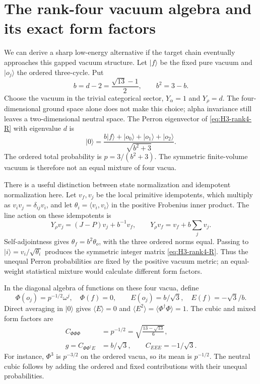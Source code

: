 \section{The rank-four vacuum algebra and its exact form factors}

We can derive a sharp low-energy alternative if the target chain
eventually approaches this gapped vacuum structure. Let $|f\rangle$
be the fixed pure vacuum and $|o_j\rangle$ the ordered three-cycle.
Put
\[
 b=d-2=\frac{\sqrt{13}-1}2,\qquad b^2=3-b.
\]
Choose the vacuum in the trivial categorical sector,
$Y_\alpha=1$ and $Y_\rho=d$. The four-dimensional ground space
alone does not make this choice; alpha invariance still leaves a
two-dimensional neutral space. The Perron eigenvector of
\eqref{eq:H3-rank4-R} with eigenvalue
$d$ is
\[
 |0\rangle=\frac{b|f\rangle+|o_0\rangle+|o_1\rangle+|o_2\rangle}
                  {\sqrt{b^2+3}}.
\]
The ordered total probability is $p=3/(b^2+3)$. The symmetric
finite-volume vacuum is therefore not an equal mixture of four
vacua.

There is a useful distinction between state normalization and
idempotent normalization here. Let $v_f,v_j$ be the local primitive
idempotents, which multiply as $v_i v_j=\delta_{ij}v_i$, and let
$\theta_i=\langle v_i,v_i\rangle$ in the positive Frobenius
inner product. The line action on these idempotents is
\[
 Y_\rho v_j=(J-P)v_j+b^{-1}v_f,
 \qquad Y_\rho v_f=v_f+b\sum_jv_j.
\]
Self-adjointness gives $\theta_f=b^2\theta_o$, with the three
ordered norms equal. Passing to $|i\rangle=v_i/\sqrt{\theta_i}$
produces the symmetric integer matrix
\eqref{eq:H3-rank4-R}. Thus the unequal Perron probabilities are
fixed by the positive vacuum metric; an equal-weight statistical
mixture would calculate different form factors.

In the diagonal algebra of functions on these four vacua, define
\[
 \Phi(o_j)=p^{-1/2}\omega^j,\quad \Phi(f)=0,
 \qquad E(o_j)=b/\sqrt3,\quad E(f)=-\sqrt3/b.
\]
Direct averaging in $|0\rangle$ gives
$\langle E\rangle=0$ and
$\langle E^2\rangle=\langle\Phi^\dagger\Phi\rangle=1$.
The cubic and mixed form factors are
\begin{align}
 C_{\Phi\Phi\Phi}&=p^{-1/2}
       =\sqrt{\frac{13-\sqrt{13}}6},\label{eq:rank4-charged}\\
 g=C_{\Phi\Phi^\dagger E}&=b/\sqrt3,
 \qquad C_{EEE}=-1/\sqrt3.\label{eq:rank4-neutral}
\end{align}
For instance, $\Phi^3$ is $p^{-3/2}$ on the ordered vacua, so its
mean is $p^{-1/2}$. The neutral cubic follows by adding the ordered
and fixed contributions with their unequal probabilities.

